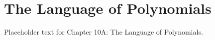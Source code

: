 \section{The Language of Polynomials}
Placeholder text for Chapter 10A: The Language of Polynomials.

